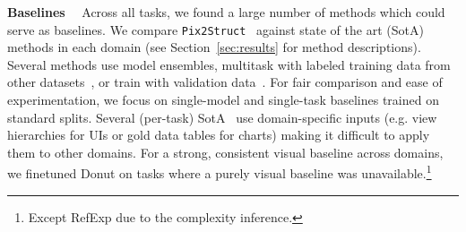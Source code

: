 \documentclass{article} \usepackage[accepted]{icml2023}
\newcommand\ourmodel{{\texttt{Pix2Struct}}}
\begin{document}
\textbf{Baselines}~~
Across all tasks, we found a large number of methods which could serve as baselines. We compare \ourmodel~ against state of the art (SotA) methods in each domain (see Section~\ref{sec:results} for method descriptions). Several methods use model ensembles, multitask with labeled training data from other datasets~\citep{powalski2021going,wang2022git}, or train with validation data~\citep{li2021structurallm}. For fair comparison and ease of experimentation,
we focus on single-model and single-task baselines trained on standard splits. Several (per-task) SotA~\citep{li2021vut,masry-etal-2022-chartqa} use  domain-specific inputs (e.g. view hierarchies for UIs or gold data tables for charts) making it difficult to apply them to other domains. 
For a strong, consistent visual baseline across domains, we finetuned Donut on tasks where a purely visual baseline was unavailable.\footnote{Except RefExp due to the complexity inference.}
\end{document}
